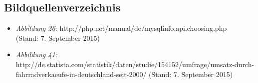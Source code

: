 \subsection*{Bildquellenverzeichnis}
\begin{itemize}
	\item \textit{Abbildung 26:} http://php.net/manual/de/mysqlinfo.api.choosing.php\\ (Stand: 7. September 2015)
	\item \textit{Abbildung 41:} http://de.statista.com/statistik/daten/studie/154152/umfrage/umsatz-durch-fahrradverkaeufe-in-deutschland-seit-2000/ (Stand: 7. September 2015)
\end{itemize}